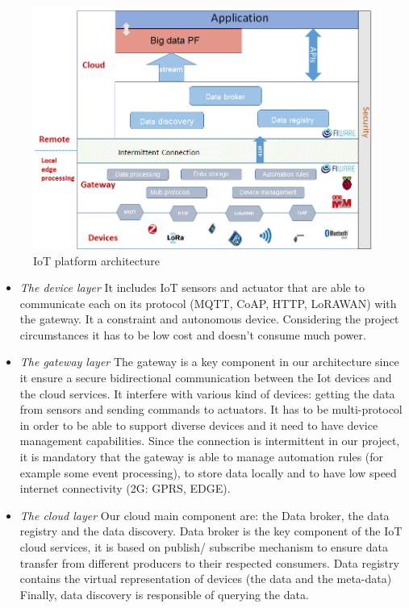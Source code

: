 \begin{figure}[h]
\centering
\includegraphics[width=\textwidth]{figs/iotarchi.png}
\caption{IoT platform architecture}
\label{fig:iotarchi}
\end{figure}

\begin{itemize}
  \item \emph{The device layer}
    It includes IoT sensors and actuator that are able to communicate each on its protocol (MQTT, CoAP, HTTP, LoRAWAN) with the gateway. 
It a constraint and autonomous device. 
Considering the project circumstances it has to be low cost and doesn’t consume much power.
  \item \emph{The gateway layer}
  The gateway is a key component in our architecture since it ensure a secure bidirectional communication between the Iot devices and the cloud services.
 It interfere with various kind of devices: getting the data from sensors and sending commands to actuators.
  It has to be multi-protocol in order to be able to support diverse devices and it need to have device management capabilities.
Since the connection is intermittent in our project, it is mandatory that the gateway is able to manage automation rules (for example some event processing), to store data locally and to have low speed internet connectivity (2G: GPRS, EDGE).
  \item \emph{The cloud layer}
  Our cloud main component are: the Data broker, the data registry and the data discovery. 
Data broker is the key component of the IoT cloud services, it is based on publish/ subscribe mechanism to ensure data transfer from different producers to their respected consumers.
Data registry contains the virtual representation of devices (the data and the meta-data)
Finally, data discovery is responsible of querying the data.
\end{itemize}

